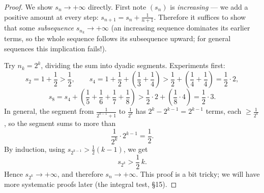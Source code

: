 \documentclass[11pt]{report}
\begin{document}
\begin{proof}
We show $s_n \to +\infty$ directly. First note $(s_n)$ is \emph{increasing} --- we add a positive amount at every step: $s_{n+1} = s_n + \tfrac{1}{n+1}$. Therefore it suffices to show that some \emph{subsequence} $s_{n_k} \to +\infty$ (an increasing sequence dominates its earlier terms, so the whole sequence follows its subsequence upward; for general sequences this implication fails!).

Try $n_k = 2^k$, dividing the sum into dyadic segments. Experiments first:
\[
s_{2} = 1 + \frac12 > \frac12, \qquad
s_{4} = 1 + \frac12 + \left(\frac13 + \frac14\right) > \frac12 + \left(\frac14 + \frac14\right) = \frac12 \cdot 2,
\]
\[
s_{8} = s_4 + \left(\frac15 + \frac16 + \frac17 + \frac18\right) > \frac12\cdot 2 + \left(\frac18 \cdot 4\right) = \frac12 \cdot 3.
\]
In general, the segment from $\tfrac{1}{2^{k-1}+1}$ to $\tfrac{1}{2^k}$ has $2^k - 2^{k-1} = 2^{k-1}$ terms, each $\geq \tfrac{1}{2^k}$, so the segment sums to more than
\[
\frac{1}{2^k} \cdot 2^{k-1} = \frac12.
\]
By induction, using $s_{2^{k-1}} > \tfrac12 (k-1)$, we get
\[
s_{2^k} > \frac12\, k.
\]
Hence $s_{2^k} \to +\infty$, and therefore $s_n \to +\infty$. This proof is a bit tricky; we will have more systematic proofs later (the integral test, \S 15).
\end{proof}
\end{document}
